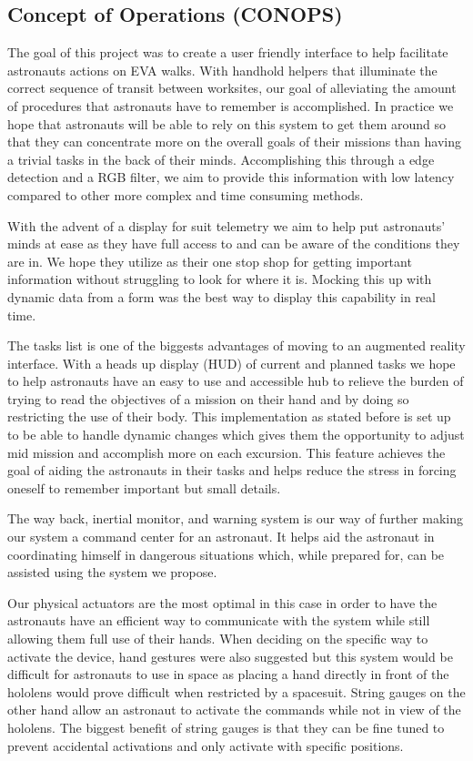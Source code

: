 \documentclass{article}
\let\Oldsubsection\subsection
\renewcommand{\subsection}{\FloatBarrier\Oldsubsection}
\begin{document}
\subsection{Concept of Operations (CONOPS)}

The goal of this project was to create a user friendly interface to help facilitate astronauts actions on EVA walks. With handhold helpers that illuminate the correct sequence of transit between worksites, our goal of alleviating the amount of procedures that astronauts have to remember is accomplished. In practice we hope that astronauts will be able to rely on this system to get them around so that they can concentrate more on the overall goals of their missions than having a trivial tasks in the back of their minds. Accomplishing this through a edge detection and a RGB filter, we aim to provide this information with low latency compared to other more complex and time consuming methods.

With the advent of a display for suit telemetry we aim to help put astronauts’ minds at ease as they have full access to and can be aware of the conditions they are in. We hope they utilize as their one stop shop for getting important information without struggling to look for where it is. Mocking this up with dynamic data from a form was the best way to display this capability in real time.

The tasks list is one of the biggests advantages of moving to an augmented reality interface. With a heads up display (HUD) of current and planned tasks we hope to help astronauts have an easy to use and accessible hub to relieve the burden of trying to read the objectives of a mission on their hand and by doing so restricting the use of their body. This implementation as stated before is set up to be able to handle dynamic changes which gives them the opportunity to adjust mid mission and accomplish more on each excursion. This feature achieves the goal of aiding the astronauts in their tasks and helps reduce the stress in forcing oneself to remember important but small details.

The way back, inertial monitor, and warning system is our way of further making our system a command center for an astronaut. It helps aid the astronaut in coordinating himself in dangerous situations which, while prepared for, can be assisted using the system we propose.

Our physical actuators are the most optimal in this case in order to have the astronauts have an efficient way to communicate with the system while still allowing them full use of their hands. When deciding on the specific way to activate the device, hand gestures were also suggested but this system would be difficult for astronauts to use in space as placing a hand directly in front of the hololens would prove difficult when restricted by a spacesuit. String gauges on the other hand allow an astronaut to activate the commands while not in view of the hololens. The biggest benefit of string gauges is that they can be fine tuned to prevent accidental activations and only activate with specific positions.
\end{document}
